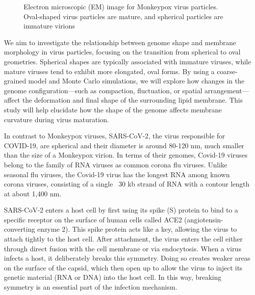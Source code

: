 \documentclass[12pt]{article}
\begin{document}
\begin{flushleft}
\begin{figure}[!ht]
  \centering  
  \caption{Electron microscopic (EM) image for
Monkeypox virus particles. Oval-shaped
virus particles are mature, and spherical
particles are immature virions \cite{goldsmith2003monkeypox}}
\end{figure}

We aim to investigate the relationship between genome shape and membrane morphology in virus particles, focusing on the transition from spherical to oval geometries. Spherical shapes are typically associated with immature viruses, while mature viruses tend to exhibit more elongated, oval forms. By using a coarse-grained model and Monte Carlo simulations, we will explore how changes in the genome configuration—such as compaction, fluctuation, or spatial arrangement—affect the deformation and final shape of the surrounding lipid membrane. This study will help elucidate how the shape of the genome affects membrane curvature during virus maturation.





In contrast to Monkeypox viruses, SARS-CoV-2, the virus responsible for COVID-19, are spherical and their diameter is around 80-120 nm, much smaller than the size of a Monkeypox virion. In terms of
their genomes, Covid-19 viruses belong to the family of
RNA viruses as common corona flu viruses. Unlike
seasonal flu viruses, the Covid-19 virus has the longest
RNA among known corona viruses, consisting of a single
~30 kb strand of RNA with a contour length at about
1,400 nm. \cite{baron2020sars}\cite{Wu2022}


SARS-CoV-2 enters a host cell by first using its spike (S) protein to bind to a specific receptor on the surface of human cells called ACE2 (angiotensin-converting enzyme 2). This spike protein acts like a key, allowing the virus to attach tightly to the host cell. After attachment, the virus enters the cell either through direct fusion with the cell membrane or via endocytosis.\cite{Barrow2013}\cite{payne2022viruses} When a virus infects a host, it deliberately breaks this symmetry. Doing so creates weaker areas on the surface of the capsid, which then open up to allow the virus to inject its genetic material (RNA or DNA) into the host cell. In this way, breaking symmetry is an essential part of the infection mechanism.


\end{flushleft}
\end{document}

